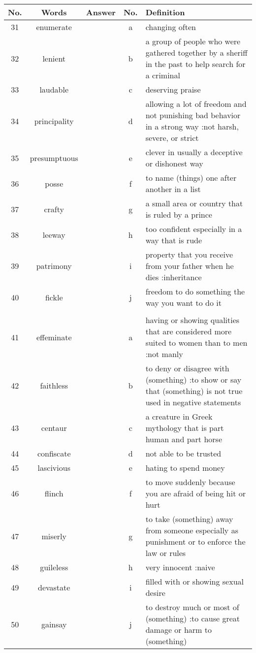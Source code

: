 \documentclass[a4paper]{article}
\begin{document}
\begin{center}
\begin{tabular}{|c|c|c|c|m{}|}
\hline
No. & Words & Answer & No. & Definition \\
\hline
 31 & enumerate & & a &  changing often \\
\hline
 32 & lenient & & b &  a group of people who were gathered together by a sheriff in the past to help search for a criminal \\
\hline
 33 & laudable & & c &  deserving praise \\
\hline
 34 & principality & & d &  allowing a lot of freedom and not punishing bad behavior in a strong way :not harsh, severe, or strict \\
\hline
 35 & presumptuous & & e &  clever in usually a deceptive or dishonest way \\
\hline
 36 & posse & & f &  to name (things) one after another in a list \\
\hline
 37 & crafty & & g &  a small area or country that is ruled by a prince\\
\hline
 38 & leeway & & h &  too confident especially in a way that is rude \\
\hline
 39 & patrimony & & i &  property that you receive from your father when he dies :inheritance\\
\hline
 40 & fickle & & j &  freedom to do something the way you want to do it \\
\hline
 & & & & \\
\hline
 41 & effeminate & & a &  having or showing qualities that are considered more suited to women than to men :not manly \\
\hline
 42 & faithless & & b &  to deny or disagree with (something) :to show or say that (something) is not true used in negative statements \\
\hline
 43 & centaur & & c &  a creature in Greek mythology that is part human and part horse\\
\hline
 44 & confiscate & & d &  not able to be trusted \\
\hline
 45 & lascivious & & e &  hating to spend money \\
\hline
 46 & flinch & & f &  to move suddenly because you are afraid of being hit or hurt \\
\hline
 47 & miserly & & g &  to take (something) away from someone especially as punishment or to enforce the law or rules \\
\hline
 48 & guileless & & h &  very innocent :naive \\
\hline
 49 & devastate & & i &  filled with or showing sexual desire \\
\hline
 50 & gainsay & & j &  to destroy much or most of (something) :to cause great damage or harm to (something) \\
\end{tabular}
\end{center}
\end{document}
